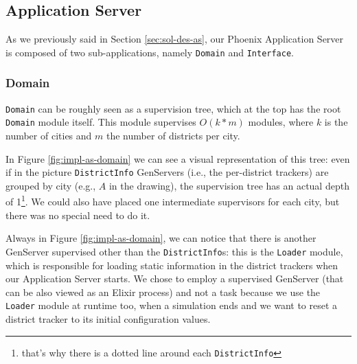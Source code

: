 \subsection{Application Server}\label{sec:impl-as}

As we previously said in Section \ref{sec:sol-des-as}, our Phoenix Application
Server is composed of two sub-applications, namely \texttt{Domain} and
\texttt{Interface}.

\subsubsection{Domain}

\texttt{Domain} can be roughly seen as a supervision tree, which at the top has
the root \texttt{Domain} module itself. This module supervises $O(k * m)$
modules, where $k$ is the number of cities and $m$ the number of districts per
city.

In Figure \ref{fig:impl-as-domain} we can see a visual representation of this
tree: even if in the picture \texttt{DistrictInfo} GenServers (i.e., the
per-district trackers) are grouped by city (e.g., $A$ in the drawing), the
supervision tree has an actual depth of 1\footnote{that's why there is a
dotted line around each \texttt{DistrictInfo}}.
We could also have placed one intermediate supervisors for each city, but
there was no special need to do it.

Always in Figure \ref{fig:impl-as-domain}, we can notice that there is another
GenServer supervised other than the \texttt{DistrictInfo}s: this is the
\texttt{Loader} module, which is responsible for loading static information in
the district trackers when our Application Server starts. We chose to employ a
supervised GenServer (that can be also viewed as an Elixir process) and not a
task because we use the \texttt{Loader} module at runtime too, when a
simulation ends and we want to reset a district tracker to its initial
configuration values.

